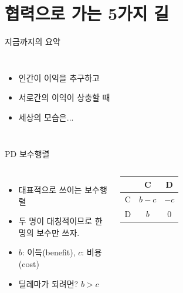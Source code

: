\documentclass[final]{beamer}
\begin{document}

\section{협력으로 가는 5가지 길} %
\label{sec:cooperation}

\begin{frame}[t]{지금까지의 요약}
	\begin{columns}[c]
		\column{15em}
		\begin{itemize}
			\item 인간이 이익을 추구하고 
			\item 서로간의 이익이 상충할 때 
			\item 세상의 모습은...
		\end{itemize}
		\column{20em}
	\end{columns}
\end{frame}

\begin{frame}[t]{PD 보수행렬}
	\begin{columns}[c]
		\column{15em}
		\begin{itemize}
			\item 대표적으로 쓰이는 보수행렬
			\item 두 명이 대칭적이므로 한 명의 보수만 쓰자.
			\item $b$: 이득(benefit), $c$: 비용(cost) 
			\item 딜레마가 되려면? $b>c$
		\end{itemize}
		\column{20em}
		\begin{table}
			\setlength{\tabcolsep}{1.2em}
			\begin{tabular}{|c|c|c|} \hline
				& {C} &  {D}\\ \hline
				{C} & {$b-c$} & {$-c$} \\ \hline%
				{D} & {$b$}    & {$0$} \\ 
				\hline
			\end{tabular}
		\end{table}
	\end{columns}
\end{frame}
\end{document}
